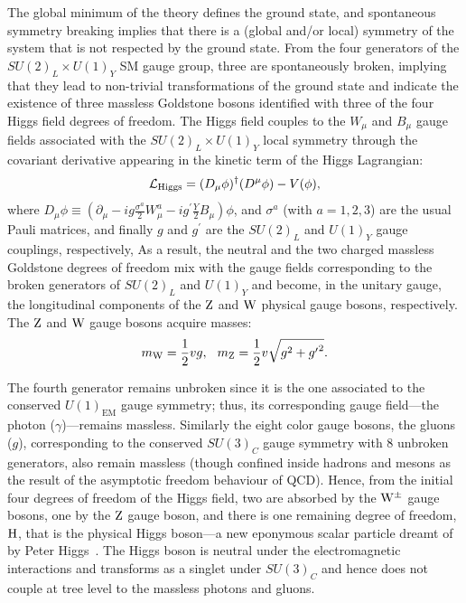 The global minimum of the theory defines the ground state, and spontaneous symmetry breaking implies that there is a (global and/or local) symmetry of the system that is not respected by the ground state.
From the four generators of the $SU(2)_L \times U(1)_Y$ SM gauge group, three are spontaneously broken, implying that they lead to non-trivial transformations of the ground state and indicate the existence of three massless Goldstone bosons identified with three of the four Higgs field degrees of freedom.
The Higgs field couples to the $W_\mu$ and $B_\mu$ gauge fields associated with the $SU(2)_L \times U(1)_Y$ local symmetry through the covariant derivative appearing in the kinetic term of the Higgs Lagrangian:
\begin{equation}
    \mathcal{L}_\text{Higgs} = (D_\mu\phi)^\dagger(D^\mu\phi) - V(\phi),
\end{equation}
where $D_\mu\phi \equiv \left( \partial_\mu - ig \frac{\sigma^a}{2}W^a_\mu - ig^\prime \frac{Y}{2} B_\mu \right)\phi$,
and $\sigma^a$ (with $a = 1,2,3$) are the usual Pauli matrices,
and finally $g$ and $g^\prime$ are the $SU(2)_L$ and $U(1)_Y$ gauge couplings, respectively,
As a result, the neutral and the two charged massless Goldstone degrees of freedom mix with the gauge fields corresponding to the broken generators of $SU(2)_L$ and $U(1)_Y$ and become, in the unitary gauge, the longitudinal components of the $\text{Z}$ and $\mathrm{W}$ physical gauge bosons, respectively.
The $\text{Z}$ and $\mathrm{W}$ gauge bosons acquire masses:
\begin{equation}
    m_{\mathrm{W}} = \frac{1}{2}vg, \hspace{7pt} m_{\text{Z}} = \frac{1}{2} v \sqrt{g^2+{g^\prime}^2}.
\end{equation}

The fourth generator remains unbroken since it is the one associated to the conserved $U(1)_\text{EM}$ gauge symmetry; thus, its corresponding gauge field---the photon ($\gamma$)---remains massless.
Similarly the eight color gauge bosons, the gluons ($g$), corresponding to the conserved $SU(3)_C$ gauge symmetry with 8 unbroken generators, also remain massless (though confined inside hadrons and mesons as the result of the asymptotic freedom behaviour of QCD).
Hence, from the initial four degrees of freedom of the Higgs field, two are absorbed by the $\mathrm{W}^\pm$ gauge bosons, one by the $\text{Z}$ gauge boson, and there is one remaining degree of freedom, $\mathrm{H}$, that is the physical Higgs boson---a new eponymous scalar particle dreamt of by Peter Higgs~\cite{PhysRevLett.13.321,PhysRev.145.1156}.
The Higgs boson is neutral under the electromagnetic interactions and transforms as a singlet under $SU(3)_C$ and hence does not couple at tree level to the massless photons and gluons.

